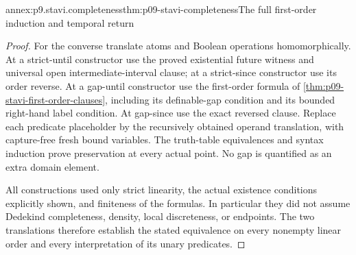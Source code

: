 \begin{annexitem}{annex:p9.stavi.completeness}{thm:p09-stavi-completeness}{The full first-order induction and temporal return}
\begin{proof}
For the converse
translate atoms and
Boolean operations
homomorphically.
At a strict-until
constructor use the
proved existential
future witness and
universal open
intermediate-interval
clause; at a strict-since
constructor use its
order reverse.
At a gap-until
constructor use the
first-order formula
of
\cref{thm:p09-stavi-first-order-clauses},
including its
definable-gap condition
and its bounded
right-hand label
condition. At gap-since
use the exact
reversed clause.
Replace each predicate
placeholder by the
recursively obtained
operand translation,
with capture-free
fresh bound variables.
The truth-table
equivalences and
syntax induction
prove preservation
at every actual
point. No gap
is quantified as
an extra domain
element.

All constructions used
only strict linearity,
the actual existence
conditions explicitly
shown, and finiteness
of the formulas.
In particular they
did not assume
Dedekind completeness,
density, local
discreteness, or
endpoints. The
two translations
therefore establish
the stated equivalence
on every nonempty
linear order and
every interpretation
of its unary
predicates.
\end{proof}
\end{annexitem}
